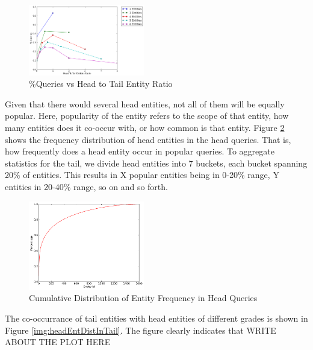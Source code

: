 \begin{figure}[t]
\label{img:headTailEntBreakup}
\caption{\%Queries vs Head to Tail Entity Ratio}
  \centering
    \includegraphics[width = 0.45\textwidth]{images/entity-head-query-ratio-dist.png}
\end{figure}

Given that there would several head entities, not all of them will be equally popular. 
Here, popularity of the entity refers to the scope of that entity, how many entities does 
it co-occur with, or how common is that entity. 
Figure \ref{img:headEntDist} shows the frequency distribution of head entities in the 
head queries. That is, how frequently does a head entity occur in popular queries. 
To aggregate statistics for the tail, we divide head entities into 7 buckets, each bucket
spanning 20\% of entities. This results in X popular entities being in 0-20\% range, Y 
entities in 20-40\% range, so on and so forth. 


\begin{figure}[t]
\label{img:headEntDist}
\caption{Cumulative Distribution of Entity Frequency in Head Queries}
  \centering
    \includegraphics[width = 0.45\textwidth]{images/entity-head-dist.png}
\end{figure}



The co-occurrance of tail entities with head entities of different grades is shown in 
Figure \ref{img:headEntDistInTail}. The figure clearly indicates that 
WRITE ABOUT THE PLOT HERE

